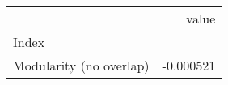 \begin{tabular}{lr}
\toprule
{} &     value \\
Index                   &           \\
\midrule
Modularity (no overlap) & -0.000521 \\
\bottomrule
\end{tabular}
